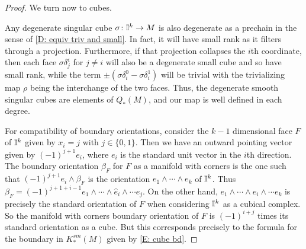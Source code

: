 \begin{proof}
	We turn now to cubes.

	Any degenerate singular cube $\sigma \colon \mathbb{I}^k \to M$ is also degenerate as a prechain in the sense of \cref{D: equiv triv and small}.
	In fact, it will have small rank as it filters through a projection.
	Furthermore, if that projection collapses the $i$th coordinate, then each face $\sigma \delta_j^\epsilon$ for $j\neq i$ will also be a degenerate small cube and so have small rank, while the term $\pm (\sigma \delta_i^0-\sigma \delta_i^1)$ will be trivial with the trivializing map $\rho$ being the interchange of the two faces.
	Thus, the degenerate smooth singular cubes are elements of $Q_*(M)$, and our map is well defined in each degree.

	For compatibility of boundary orientations, consider the $k-1$ dimensional face $F$ of $\mathbb{I}^k$ given by $x_i = j$ with $j\in\{0,1\}$.
	Then we have an outward pointing vector given by $(-1)^{j+1}e_i$, where $e_i$ is the standard unit vector in the $i$th direction.
	The boundary orientation $\beta_F$ for $F$ as a manifold with corners is the one such that
	$(-1)^{j+1}e_i \wedge \beta_F$ is the orientation $e_1 \wedge\cdots\wedge e_k$ of $\mathbb{I}^k$.
	Thus $\beta_F = (-1)^{j+1+i-1}e_1 \wedge \cdots \wedge \hat{e}_i \wedge \cdots e_j$.
	On the other hand, $e_1 \wedge \cdots \wedge \hat{e}_i \wedge \cdots e_k$ is precisely the standard orientation of $F$ when considering $\mathbb{I}^k$ as a cubical complex.
	So the manifold with corners boundary orientation of $F$ is $(-1)^{i+j}$ times its standard orientation as a cube.
	But this corresponds precisely to the formula for the boundary in $K^{sm}_*(M)$ given by \eqref{E: cube bd}.
\end{proof}

